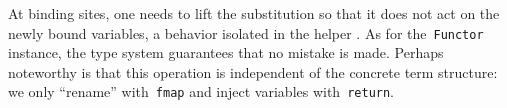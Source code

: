 \documentclass[9pt,authoryear]{sigplanconf}
\begin{document}
%
At binding sites, one needs to lift the substitution so that it does not
    act on the newly bound variables, a behavior isolated in the helper \texttt{\makebox[1.22ex][c]{\textgreater{}}\makebox[1.22ex][c]{\textgreater{}}}. As for the{~}\texttt{Functor} instance,
    the type system guarantees that no mistake is made. Perhaps
    noteworthy is that this operation is independent of the concrete
    term structure{:} we only {``}rename{''} with{~}\texttt{fmap} and inject variables
    with{~}\texttt{return}.%


{\nopagebreak }

%
%
%
\end{document}
